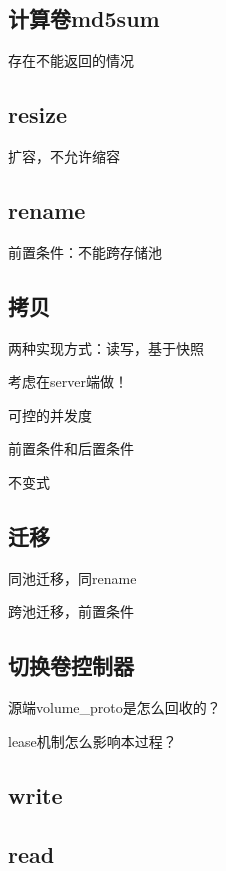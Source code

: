 \subsection{计算卷md5sum}

存在不能返回的情况

\subsection{resize}

扩容，不允许缩容

\subsection{rename}

前置条件：不能跨存储池

\subsection{拷贝}

两种实现方式：读写，基于快照

考虑在server端做！

可控的并发度

前置条件和后置条件

不变式

\subsection{迁移}

同池迁移，同rename

跨池迁移，前置条件

\subsection{切换卷控制器}

\begin{compactenum}
\item 源端volume\_proto是怎么回收的？
\item lease机制怎么影响本过程？
\end{compactenum}

\subsection{write}

\subsection{read}

